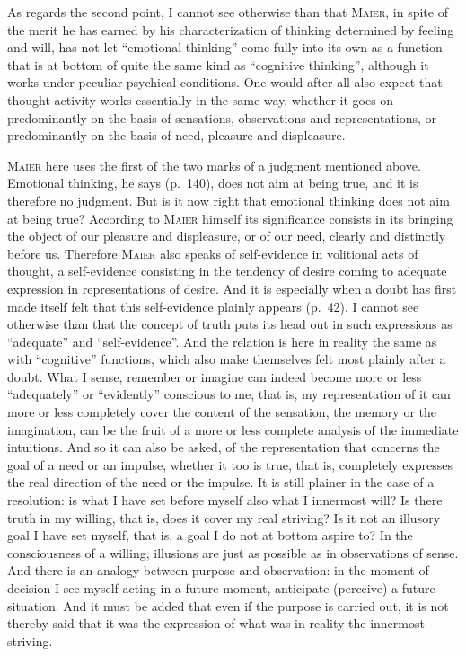 \documentclass[12pt]{book}
\newcommand{\opage}[1]{\marginnote{\footnotesize\textit{[#1]}}}
\begin{document}
As regards the second point, I cannot see otherwise than that \textsc{Maier}, in
spite of the merit he has earned by his characterization of thinking determined
by feeling and will, has not let ``emotional thinking'' come fully into its own
as a function that is at bottom of quite the same kind as ``cognitive thinking'',
although it works under peculiar psychical conditions. One would after all also
expect that thought-activity works essentially in the same way, whether it goes
on predominantly on the basis of sensations, observations and representations,
or predominantly on the basis of need, pleasure and displeasure.

\textsc{Maier} here uses the first of the two marks of \opage{27}a judgment mentioned
above. Emotional thinking, he says (p.\ 140), does not aim at being true, and it
is therefore no judgment. But is it now right that emotional thinking does not
aim at being true? According to \textsc{Maier} himself its significance consists
in its bringing the object of our pleasure and displeasure, or of our need,
clearly and distinctly before us. Therefore \textsc{Maier} also speaks of
self-evidence in volitional acts of thought, a self-evidence consisting in the
tendency of desire coming to adequate expression in representations of desire.
And it is especially when a doubt has first made itself felt that this
self-evidence plainly appears (p.\ 42). I cannot see otherwise than that the
concept of truth puts its head out in such expressions as ``adequate'' and
``self-evidence''. And the relation is here in reality the same as with
``cognitive'' functions, which also make themselves felt most plainly after a
doubt. What I sense, remember or imagine can indeed become more or less
``adequately'' or ``evidently'' conscious to me, that is, my representation of it
can more or less completely cover the content of the sensation, the memory or the
imagination, can be the fruit of a more or less complete analysis of the
immediate intuitions. And so it can also be asked, of the representation that
concerns the goal of a need or an impulse, whether it too is true, that is,
completely expresses the real direction of the need or the impulse. It is still
plainer in the case of a resolution: is what I have set before myself also what
I innermost will? Is there truth in my willing, that is, does it cover my real
striving? Is it not an illusory goal I have set myself, that is, a goal I do not
at bottom aspire to? In the consciousness of a willing, illusions are just as
possible as in observations of sense. And there is an analogy between purpose and
observation: in the moment of decision I see myself acting in a future moment,
anticipate (perceive) a future situation. And it must be added that even if the
purpose is carried out, it is not thereby said that it was the expression of what
was in reality the innermost striving.
\end{document}
